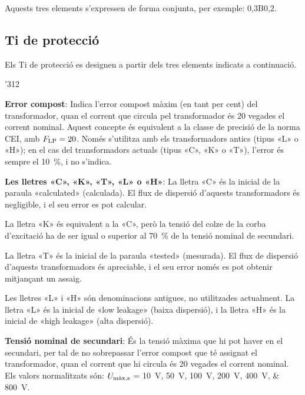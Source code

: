 Aquests tres elements s'expressen de forma conjunta, per exemple:
0,3B0,2.

\subsection{Ti de protecció}

Els Ti de protecció es designen a
partir dels tres elements indicats a continuació.

\begin{dingautolist}{'312}
    \item \textbf{Error compost}: Indica l'error compost màxim (en tant per cent) del
    transformador, quan el corrent que circula pel
    transformador és 20 vegades el corrent nominal. Aquest concepte
     és equivalent a la classe de precisió de la norma CEI,
     amb $F_\mathrm{LP}=20$. Només s'utilitza amb els transformadors antics (tipus «L» o «H»); en el cas del transformadors actuals
     (tipus «C», «K» o «T»), l'error és sempre el \SI{10}{\percent}, i no s'indica.

    \item \textbf{Les lletres «C», «K», «T», «L» o «H»}: La lletra «C» és la inicial de la
    paraula  «calculated» (calculada). El flux de dispersió d'aquests transformadors és negligible, i el seu error es pot calcular.

    La lletra «K» és equivalent a la «C», però la tensió del colze de la corba d'excitació ha de ser igual o superior al \SI{70}{\percent}
    de la tensió nominal de secundari.

    La lletra «T» és la inicial de la   paraula  «tested» (mesurada). El flux de dispersió d'aquests transformadors és apreciable, i el seu error només es pot obtenir mitjançant un assaig.

    Les lletres «L» i «H» són denominacions antigues,  no utilitzades actualment. La lletra «L» és la inicial de «low leakage» (baixa
    dispersió), i la lletra «H» és la inicial de «high leakage» (alta dispersió).

    \item \textbf{Tensió nominal de secundari}: És la tensió màxima
    que hi pot haver en el secundari, per tal de no sobrepassar l'error compost que té
    assignat el transformador, quan el corrent que hi circula
     és 20 vegades el corrent nominal. Els valors
    normalitzats són: $U_\mathrm{m\grave{a}x,s}$ = \SIlist{10; 50; 100; 200; 400; 800}{V}.


\end{dingautolist}
